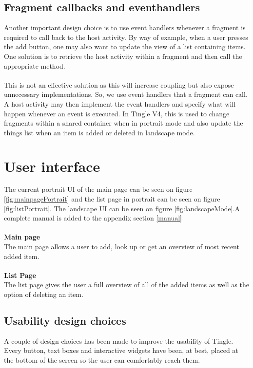 \documentclass{article}
\begin{document}
\subsection{Fragment callbacks and eventhandlers}
Another important design choice is to use event handlers whenever a fragment is required to call back to the host activity. By way of example, when a user presses the add button, one may also want to update the view of a list containing items. One solution is to retrieve the host activity within a fragment and then call the appropriate method.\\\\This is not an effective solution as this will increase coupling but also expose unnecessary implementations. So, we use event handlers that a fragment can call. A host activity may then implement the event handlers and specify what will happen whenever an event is executed. In Tingle V4, this is used to change fragments within a shared container when in portrait mode and also update the things list when an item is added or deleted in landscape mode.

\section{User interface}
The current portrait UI of the main page can be seen on figure \ref{fig:mainpagePortrait} and the list page in portrait can be seen on figure  \ref{fig:listPortrait}. The landscape UI can be seen on figure \ref{fig:landscapeMode}.A complete manual is added to the appendix section \ref{manual}\\\\\textbf{Main page}\\The main page allows a user to add, look up or get an overview of most recent added item.\\\\\textbf{List Page}\\The list page gives the user a full overview of all of the added items as well as the option of deleting an item. 

\subsection{Usability design choices}
A couple of design choices has been made to improve the usability of Tingle. Every button, text boxes and interactive widgets have been, at best, placed at the bottom of the screen so the user can comfortably reach them.
 
\end{document}
